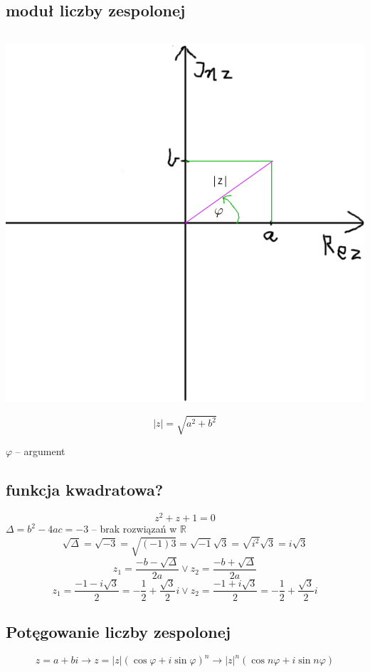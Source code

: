 \documentclass[11pt]{article}
\begin{document}
\subsection{moduł liczby zespolonej}
\label{sec:org797e941}
$$$$
\begin{center}
\includegraphics[width=.9\linewidth]{./figure01.png}
\end{center}

$$|z|=\sqrt{a^2+b^2}$$

\(\varphi\) -- argument

\subsection{funkcja kwadratowa?}
\label{sec:org4fc8cb0}
$$z^2+z+1=0$$
\(\Delta = b^2-4ac = -3\) -- brak rozwiązań w \(\mathbb{R}\)
$$\sqrt{\Delta} = \sqrt{-3} = \sqrt{(-1)3} = \sqrt{-1}  \sqrt{3} = \sqrt{i^2}\sqrt{3} = i \sqrt{3} $$
$$z_1 = \frac{-b - \sqrt{\Delta} }{2a} \lor z_2=\frac{-b + \sqrt{\Delta} }{2a}$$
$$z_1 = \frac{-1-i\sqrt{3}}{2} = -\frac{1}{2} + \frac{\sqrt{3}}{2}i \lor
z_2 = \frac{-1 + i\sqrt{3}}{2} = - \frac{1}{2}+ \frac{\sqrt{3}}{2}i $$
\subsection{Potęgowanie liczby zespolonej}
\label{sec:org1809e95}
$$z=a+bi \to z=|z|(\cos \varphi + i \sin \varphi)^n \to |z|^n(\cos n \varphi + i \sin n \varphi)$$
\end{document}
